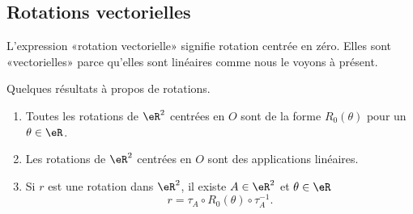 \subsection{Rotations vectorielles}

L'expression «rotation vectorielle» signifie rotation centrée en zéro. Elles sont «vectorielles» parce qu'elles sont linéaires comme nous le voyons à présent.

\begin{proposition}     \label{PROPooTFNSooFjiWHG}
	Quelques résultats à propos de rotations.
	\begin{enumerate}
		\item       \label{ITEMooONJOooRgycsQ}
		      Toutes les rotations de \( \eR^2\) centrées en \( O\) sont de la forme \( R_0(\theta)\) pour un \( \theta\in \eR\).
		\item
		      Les rotations de \( \eR^2\) centrées en \( O\) sont des applications linéaires.
		\item       \label{ITEMooSIHZooBEJhdu}
		      Si \( r\) est une rotation dans \( \eR^2\), il existe \( A\in \eR^2\) et \( \theta\in \eR\)
		      \begin{equation}
			      r=\tau_A\circ R_0(\theta)\circ \tau_A^{-1}.
		      \end{equation}
	\end{enumerate}
\end{proposition}

